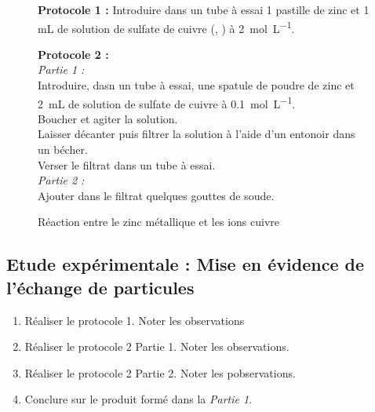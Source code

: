 \documentclass[a4paper,12pt,fleqn]{article}%
\begin{document}
\begin{figure}[h!]
    \caption{Réaction entre le zinc métallique et les ions cuivre}
        \textbf{Protocole 1 : }
        Introduire dans un tube à essai 1 pastille de zinc  et 1 mL de solution de sulfate de cuivre (, ) à \SI{2}{\mole\per\liter}.
    \vspace{2em}

        \textbf{Protocole 2 :}\\
        \emph{Partie 1 :} \\
        Introduire, dasn un tube à essai, une spatule de poudre de zinc et \SI{2}{mL} de solution de sulfate de cuivre à \SI{0,1}{\mole\per\liter}.\\
        Boucher et agiter la solution.\\
        Laisser décanter puis filtrer la solution à l'aide d'un entonoir dans un bécher.\\
        Verser le filtrat dans un tube à essai.\\
        \emph{Partie 2 :}\\
        Ajouter dans le filtrat quelques gouttes de soude.
\end{figure}

    \subsection{Etude expérimentale : Mise en évidence de l'échange de particules}
    \begin{enumerate}
        \item Réaliser le protocole 1. Noter les observations
        \item Réaliser le protocole 2 Partie 1. Noter les observations.
        \item Réaliser le protocole 2 Partie 2. Noter les pobservations.
        \item Conclure sur le produit formé dans la \emph{Partie 1}.
    \end{enumerate}
\end{document}
